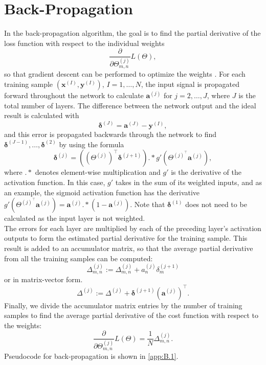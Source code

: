 \documentclass[honours,12pt]{unswthesis}
\numberwithin{equation}{section}
\theoremstyle{definition}
\begin{document}
\section{Back-Propagation}\label{sec:2.7}
In the back-propagation algorithm, the goal is to find the partial derivative of the loss function with respect to the individual weights \[\frac{\partial}{\partial\Theta_{m,n}^{(j)}}L(\Theta),\]
so that gradient descent can be performed to optimize the weights \citep{backprop}. For each training sample $\left(\bm{x}^{(I)},\bm{y}^{(I)}\right)$, $I=1,\dots,N$, the input signal is propagated forward throughout the network to calculate $\bm{a}^{(j)}$ for $j=2,\dots,J$, where $J$ is the total number of layers. The difference between the network output and the ideal result is calculated with 
\[\bm{\delta}^{(J)}=\bm{a}^{(J)}-\bm{y}^{(I)},\] 
and this error is propagated backwards through the network to find $\bm{\delta}^{(J-1)},\dots,\bm{\delta}^{(2)}$ by using the formula 
\[\bm{\delta}^{(j)}=\left(\left(\Theta^{(j)}\right)^\top \bm{\delta}^{(j+1)}\right).*g'\left(\Theta^{(j)^\top} \bm{a}^{(j)}\right),\] 
where $.*$ denotes element-wise multiplication and $g'$ is the derivative of the activation function. In this case, $g'$ takes in the sum of its weighted inputs, and as an example, the sigmoid activation function has the derivative $g'\left(\Theta^{(j)^\top} \bm{a}^{(j)}\right)=\bm{a}^{(j)}.*\left(1-\bm{a}^{(j)}\right)$. Note that $\bm{\delta}^{(1)}$ does not need to be calculated as the input layer is not weighted. \\
The errors for each layer are multiplied by each of the preceding layer's activation outputs to form the estimated partial derivative for the training sample. This result is added to an accumulator matrix, so that the average partial derivative from all the training samples can be computed:
\[\Delta^{(j)}_{m,n}:=\Delta^{(j)}_{m,n}+a_n^{(j)}\delta_m^{(j+1)}\]
or in matrix-vector form.
\[\Delta^{(j)}:=\Delta^{(j)}+\bm{\delta}^{(j+1)}\left(\bm{a}^{(j)}\right)^\top.\]
Finally, we divide the accumulator matrix entries by the number of training samples to find the average partial derivative of the cost function with respect to the weights:
\[\frac{\partial}{\partial \Theta^{(j)}_{m,n}}L(\Theta)=\frac1N \Delta_{m,n}^{(j)}.\]
Pseudocode for back-propagation is shown in \autoref{app:B.1}.\\
\end{document}
